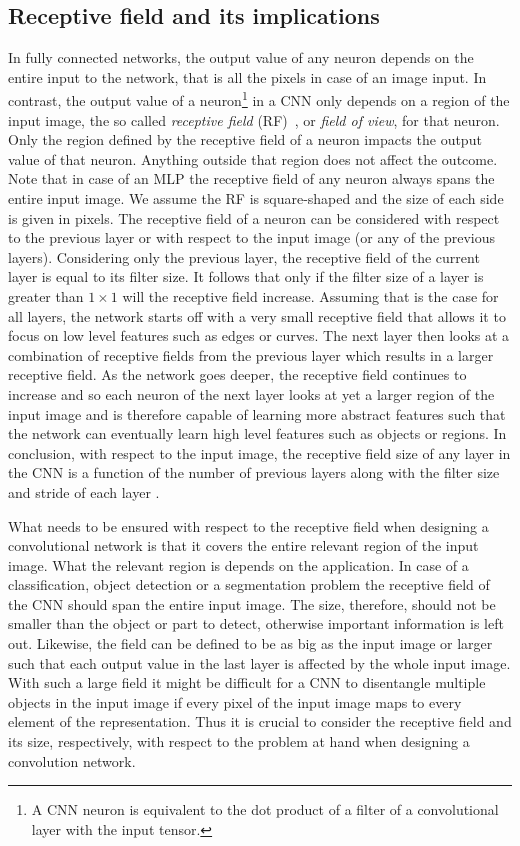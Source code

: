 \documentclass[a4paper,12pt]{report}
\begin{document}
\subsection{Receptive field and its implications}\label{sec:rf}
In fully connected networks, the output value of any neuron depends on the entire input to the network, that is all the pixels in case of an image input. In contrast, the output value of a neuron\footnote{A CNN neuron is equivalent to the dot product of a filter of a convolutional layer with the input tensor.} in a CNN only depends on a region of the input image, the so called \textit{receptive field} (RF)~\cite{ReceptiveField}, or \textit{field of view}, for that neuron. Only the region defined by the receptive field of a neuron impacts the output value of that neuron. Anything outside that region does not affect the outcome. Note that in case of an MLP the receptive field of any neuron always spans the entire input image. We assume the RF is square-shaped and the size of each side is given in pixels. The receptive field of a neuron can be considered with respect to the previous layer or with respect to the input image (or any of the previous layers). Considering only the previous layer, the receptive field of the current layer is equal to its filter size. It follows that only if the filter size of a layer is greater than $1 \times 1$ will the receptive field increase. Assuming that is the case for all layers, the network starts off with a very small receptive field that allows it to focus on low level features such as edges or curves. The next layer then looks at a combination of receptive fields from the previous layer which results in a larger receptive field. As the network goes deeper, the receptive field continues to increase and so each neuron of the next layer looks at yet a larger region of the input image and is therefore capable of learning more abstract features such that the network can eventually learn high level features such as objects or regions. In conclusion, with respect to the input image, the receptive field size of any layer in the CNN is a function of the number of previous layers along with the filter size and stride of each layer \cite{li_recept_field_2017}.

What needs to be ensured with respect to the receptive field when designing a convolutional network is that it covers the entire relevant region of the input image. What the relevant region is depends on the application. In case of a classification, object detection or a segmentation problem the receptive field of the CNN should span the entire input image. The size, therefore, should not be smaller than the object or part to detect, otherwise important information is left out. Likewise, the field can be defined to be as big as the input image or larger such that each output value in the last layer is affected by the whole input image. With such a large field it might be difficult for a CNN to disentangle multiple objects in the input image if every pixel of the input image maps to every element of the representation. Thus it is crucial to consider the receptive field and its size, respectively, with respect to the problem at hand when designing a convolution network.
\end{document}
